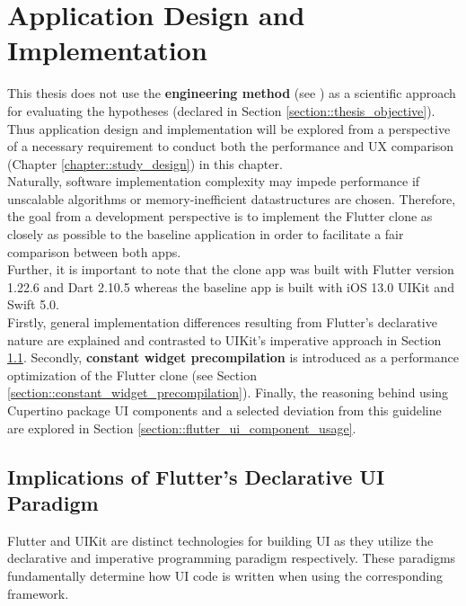 \chapter{Application Design and Implementation} \label{chapter::implementation}
This thesis does not use the \textbf{engineering method} (see \cite{Ertas1996}) as a scientific approach for evaluating the hypotheses (declared in Section \ref{section::thesis_objective}).
Thus application design and implementation will be explored from a perspective of a necessary requirement to conduct both the performance and UX comparison (Chapter \ref{chapter::study_design}) in this chapter.\\
Naturally, software implementation complexity may impede performance if unscalable algorithms or memory-inefficient datastructures are chosen.
Therefore, the goal from a development perspective is to implement the Flutter clone as closely as possible to the baseline application in order to facilitate a fair comparison between both apps.\\
Further, it is important to note that the clone app was built with Flutter version 1.22.6 and Dart 2.10.5 whereas the baseline app is built with iOS 13.0 UIKit and Swift 5.0.\\
Firstly, general implementation differences resulting from Flutter's declarative nature are explained and contrasted to UIKit's imperative approach in Section \ref{section::declarative_vs_imperative_ui}.
Secondly, \textbf{constant widget precompilation} is introduced as a performance optimization of the Flutter clone (see Section \ref{section::constant_widget_precompilation}).
Finally, the reasoning behind using Cupertino package UI components and a selected deviation from this guideline are explored in Section \ref{section::flutter_ui_component_usage}. 


\section{Implications of Flutter's Declarative UI Paradigm} \label{section::declarative_vs_imperative_ui}
Flutter and UIKit are distinct technologies for building UI as they utilize the declarative and imperative programming paradigm respectively. 
These paradigms fundamentally determine how UI code is written when using the corresponding framework.\\

